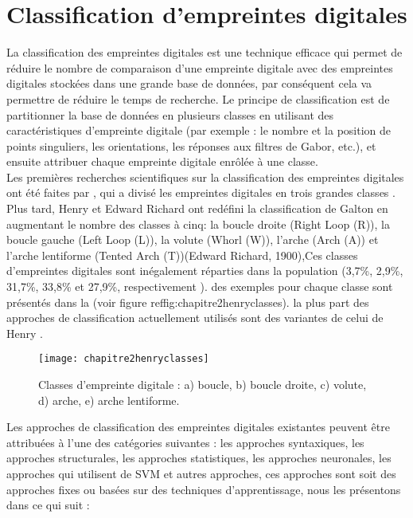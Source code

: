 \section{Classification d'empreintes digitales}
La classification des empreintes digitales est une technique efficace qui permet de réduire le nombre de comparaison d'une empreinte digitale avec des empreintes digitales stockées dans une grande base de données, par conséquent cela va permettre de réduire le temps de recherche. Le principe de classification est de partitionner la base de données en plusieurs classes en utilisant des caractéristiques d’empreinte digitale (par exemple : le nombre et la position de points singuliers, les orientations, les réponses aux filtres de Gabor, etc.), et ensuite attribuer chaque empreinte digitale enrôlée à une classe.  \\
Les premières recherches scientifiques sur la classification des empreintes digitales ont été faites par \citep{galton1892finger} , qui a divisé les empreintes digitales en trois grandes classes \citep{henry1905classification}. Plus tard, Henry et Edward Richard  ont redéfini la classification de Galton en augmentant le nombre des classes à  cinq: la boucle droite (Right Loop (R)), la boucle gauche (Left Loop (L)), la volute (Whorl (W)), l'arche (Arch (A)) et l'arche lentiforme (Tented Arch (T))(Edward Richard, 1900),Ces classes d'empreintes digitales sont inégalement réparties dans la population (3,7\%, 2,9\%, 31,7\%, 33,8\% et 27,9\%, respectivement \citep{JIANG2009}). des exemples pour chaque classe sont présentés dans la (voir figure ref{fig:chapitre2henryclasses}). la plus part des approches de classification actuellement utilisés sont des variantes de celui de Henry \citep{galar2015survey}. 

\begin{figure}[H]
	\centering
	\texttt{[image: chapitre2henryclasses]}
	\caption{Classes d'empreinte digitale : a) boucle, b) boucle droite, c) volute, d) arche, e) arche lentiforme.}
	\label{fig:chapitre2henryclasses}
\end{figure}

	Les approches de classification des empreintes digitales existantes peuvent être attribuées à l'une des catégories suivantes : les approches syntaxiques, les approches structurales, les approches statistiques, les approches neuronales, les approches qui utilisent de SVM et autres approches, ces approches sont soit des approches fixes ou basées sur des techniques d’apprentissage, nous les présentons dans ce qui suit :
